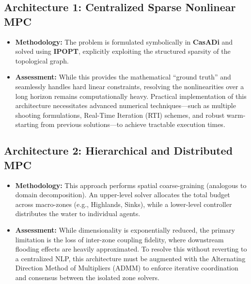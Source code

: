 \documentclass[11pt, a4paper]{article}
\begin{document}
\subsection{Architecture 1: Centralized Sparse Nonlinear MPC}
\begin{itemize}
    \item \textbf{Methodology:} The problem is formulated symbolically in \textbf{CasADi} and solved using \textbf{IPOPT}, explicitly exploiting the structured sparsity of the topological graph. 
    \item \textbf{Assessment:} While this provides the mathematical ``ground truth'' and seamlessly handles hard linear constraints, resolving the nonlinearities over a long horizon remains computationally heavy. Practical implementation of this architecture necessitates advanced numerical techniques—such as multiple shooting formulations, Real-Time Iteration (RTI) schemes, and robust warm-starting from previous solutions—to achieve tractable execution times.
\end{itemize}

\subsection{Architecture 2: Hierarchical and Distributed MPC}
\begin{itemize}
    \item \textbf{Methodology:} This approach performs spatial coarse-graining (analogous to domain decomposition). An upper-level solver allocates the total budget across macro-zones (e.g., Highlands, Sinks), while a lower-level controller distributes the water to individual agents.
    
    \item \textbf{Assessment:} While dimensionality is exponentially reduced, the primary limitation is the loss of inter-zone coupling fidelity, where downstream flooding effects are heavily approximated. To resolve this without reverting to a centralized NLP, this architecture must be augmented with the Alternating Direction Method of Multipliers (ADMM) to enforce iterative coordination and consensus between the isolated zone solvers.
\end{itemize}
\end{document}

